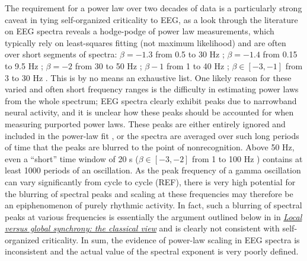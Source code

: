 The requirement for a power law over two decades of data is a particularly strong caveat in tying self-organized criticality to EEG, as a look through the literature on EEG spectra reveals a hodge-podge of power law measurements, which typically rely on least-squares fitting (not maximum likelihood) and are often over short segments of spectra: $\beta=-1.3$ from 0.5 to 30 Hz \cite{Pritchard1992}; $\beta=-1.4$ from 0.15 to 9.5 Hz \cite{Dehghani2010}; $\beta=-2$ from 30 to 50 Hz \cite{Lendner2020}; $\beta -1$ from 1 to 40 Hz \cite{Colombo2019}; $\beta\in[-3,-1]$ from 3 to 30 Hz \cite{Pereda1998}. This is by no means an exhaustive list. One likely reason for these varied and often short frequency ranges is the difficulty in estimating power laws from the whole spectrum; EEG spectra clearly exhibit peaks due to narrowband neural activity, and it is unclear how these peaks should be accounted for when measuring purported power laws. These peaks are either entirely ignored and included in the power-law fit \cite{Pritchard1992}, or the spectra are averaged over such long periods of time that the peaks are blurred to the point of nonrecognition. Above 50 Hz, even a ``short'' time window of 20 s ($\beta\in[-3,-2]$ from 1 to 100 Hz \cite{He2010}) contains at least 1000 periods of an oscillation. As the peak frequency of a gamma oscillation can vary significantly from cycle to cycle (REF), there is very high potential for the blurring of spectral peaks and scaling at these frequencies may therefore be an epiphenomenon of purely rhythmic activity. In fact, such a blurring of spectral peaks at various frequencies is essentially the argument outlined below in in \hyperref[sec:branching_prcoess]{\textit{Local versus global synchrony: the classical view}} and is clearly not consistent with self-organized criticality. In sum, the evidence of power-law scaling in EEG spectra is inconsistent and the actual value of the spectral exponent is very poorly defined. 

